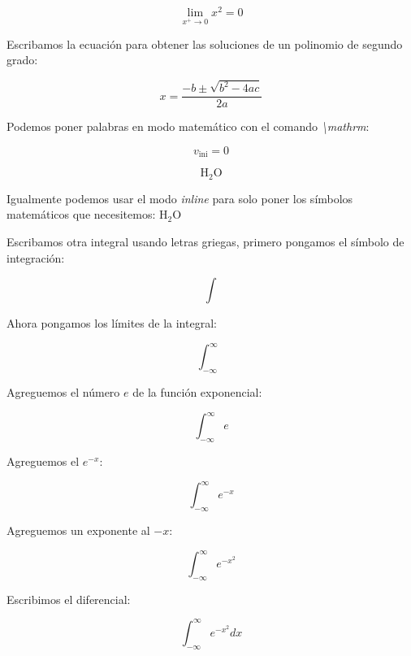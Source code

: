 \documentclass{article}
\begin{document}
\begin{equation}
\lim_{x^{+} \to 0} x^{2} = 0
\end{equation}

Escribamos la ecuación para obtener las soluciones de un polinomio de segundo grado:

\begin{equation}
    x = \dfrac{-b\pm\sqrt{b^{2}-4ac}}{2a}
\end{equation}

Podemos poner palabras en modo matemático con el comando \emph{\textbackslash mathrm}:

\begin{equation}
    v_{\mathrm{ini}} = 0
\end{equation}

\begin{equation}
    \mathrm{H}_{2}\mathrm{O}
\end{equation}

Igualmente podemos usar el modo \emph{inline} para solo poner los símbolos matemáticos que necesitemos: H$_{2}$O

Escribamos otra integral usando letras griegas, primero pongamos el símbolo de integración:

\begin{equation}
    \int
\end{equation}

Ahora pongamos los límites de la integral:

\begin{equation}
    \int_{-\infty}^{\infty}
\end{equation}

Agreguemos el número $e$ de la función exponencial:

\begin{equation}
    \int_{-\infty}^{\infty}e
\end{equation}

Agreguemos el $e^{-x}$:

\begin{equation}
    \int_{-\infty}^{\infty}e^{-x}
\end{equation}

Agreguemos un exponente al $-x$:

\begin{equation}
    \int_{-\infty}^{\infty}e^{-x^{2}}
\end{equation}

Escribimos el diferencial:

\begin{equation}
    \int_{-\infty}^{\infty}e^{-x^{2}} dx
\end{equation}
\end{document}
